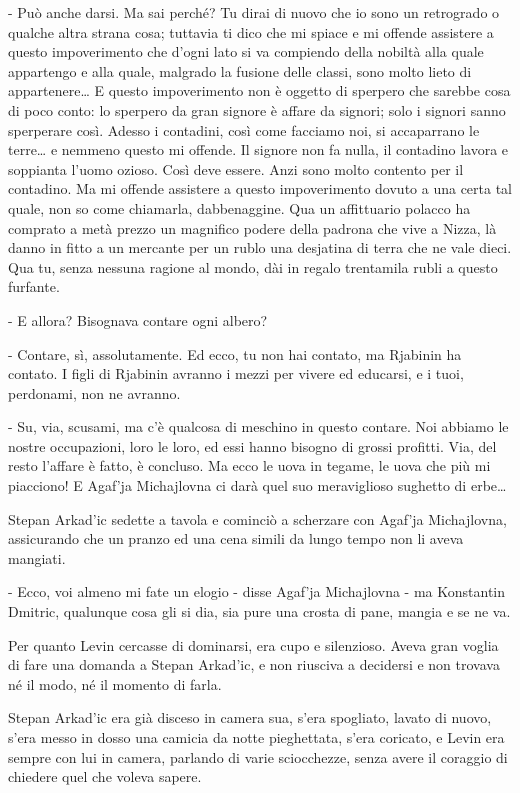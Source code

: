 - Può anche darsi. Ma sai perché? Tu dirai di nuovo che io sono un retrogrado o qualche altra strana cosa; tuttavia ti dico che mi spiace e mi offende assistere a questo impoverimento che d'ogni lato si va compiendo della nobiltà alla quale appartengo e alla quale, malgrado la fusione delle classi, sono molto lieto di appartenere\ldots{} E questo impoverimento non è oggetto di sperpero che sarebbe cosa di poco conto: lo sperpero da gran signore è affare da signori; solo i signori sanno sperperare così. Adesso i contadini, così come facciamo noi, si accaparrano le terre\ldots{} e nemmeno questo mi offende. Il signore non fa nulla, il contadino lavora e soppianta l'uomo ozioso. Così deve essere. Anzi sono molto contento per il contadino. Ma mi offende assistere a questo impoverimento dovuto a una certa tal quale, non so come chiamarla, dabbenaggine. Qua un affittuario polacco ha comprato a metà prezzo un magnifico podere della padrona che vive a Nizza, là danno in fitto a un mercante per un rublo una desjatina di terra che ne vale dieci. Qua tu, senza nessuna ragione al mondo, dài in regalo trentamila rubli a questo furfante. 

- E allora? Bisognava contare ogni albero? 

- Contare, sì, assolutamente. Ed ecco, tu non hai contato, ma Rjabinin ha contato. I figli di Rjabinin avranno i mezzi per vivere ed educarsi, e i tuoi, perdonami, non ne avranno. 

- Su, via, scusami, ma c'è qualcosa di meschino in questo contare. Noi abbiamo le nostre occupazioni, loro le loro, ed essi hanno bisogno di grossi profitti. Via, del resto l'affare è fatto, è concluso. Ma ecco le uova in tegame, le uova che più mi piacciono! E Agaf'ja Michajlovna ci darà quel suo meraviglioso sughetto di erbe\ldots{} 

Stepan Arkad'ic sedette a tavola e cominciò a scherzare con Agaf'ja Michajlovna, assicurando che un pranzo ed una cena simili da lungo tempo non li aveva mangiati. 

- Ecco, voi almeno mi fate un elogio - disse Agaf'ja Michajlovna - ma Konstantin Dmitric, qualunque cosa gli si dia, sia pure una crosta di pane, mangia e se ne va. 

Per quanto Levin cercasse di dominarsi, era cupo e silenzioso. Aveva gran voglia di fare una domanda a Stepan Arkad'ic, e non riusciva a decidersi e non trovava né il modo, né il momento di farla. 

Stepan Arkad'ic era già disceso in camera sua, s'era spogliato, lavato di nuovo, s'era messo in dosso una camicia da notte pieghettata, s'era coricato, e Levin era sempre con lui in camera, parlando di varie sciocchezze, senza avere il coraggio di chiedere quel che voleva sapere. 

